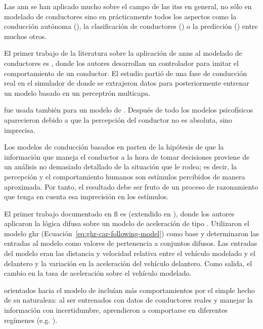Las \gls{ann} se han aplicado mucho sobre el campo de las \glspl{its} en general, no sólo en modelado de conductores sino en prácticamente todos los aspectos como la conducción autónoma (\cite{huval2015empirical}), la clasificación de conductores (\cite{DiazAlvarez2014}) o la predicción (\cite{Dougherty1993, chan2012neural}) entre muchos otros.

El primer trabajo de la literatura sobre la aplicación de \glspl{ann} al modelado de conductores es \cite{Fix1990}, donde los autores desarrollan un controlador para imitar el comportamiento de un conductor. El estudio partió de una fase de conducción real en el simulador de donde se extrajeron datos para posteriormente entrenar un modelo basado en un perceptrón multicapa.

 fue usada también para un modelo de \textit{}. Después de todo los modelos psicofísicos aparecieron debido a que la percepción del conductor no es absoluta, sino imprecisa.

Los modelos de conducción basados en  parten de la hipótesis de que la información que maneja el conductor a la hora de tomar decisiones proviene de un análisis no demasiado detallado de la situación que le rodea; es decir, la percepción y el comportamiento humanos son estímulos percibidos de manera aproximada. Por tanto, el resultado debe ser fruto de un proceso de razonamiento que tenga en cuenta esa imprecisión en los estímulos.

El primer trabajo documentado en \gls{fl} es \cite{Kikuchi1992} (extendido en \cite{Chakroborty1999}), donde los autores aplicaron la lógica difusa sobre un modelo de aceleración de tipo \textit{}. Utilizaron el modelo \gls{ghr} (Ecuación~\ref{eq:ghr-car-following-model}) como base y determinaron las entradas al modelo como valores de pertenencia a conjuntos difusos. Las entradas del modelo eran las distancia y velocidad relativa entre el vehículo modelado y el delantero y la variación en la aceleración del vehículo delantero. Como salida, el cambio en la tasa de aceleración sobre el vehículo modelado.

 orientados hacia el modelo de \textit{} incluían más comportamientos por el simple hecho de su naturaleza: al ser entrenados con datos de conductores reales y manejar la información con incertidumbre, aprendieron a comportarse en diferentes regímenes (e.g. \textit{}).

